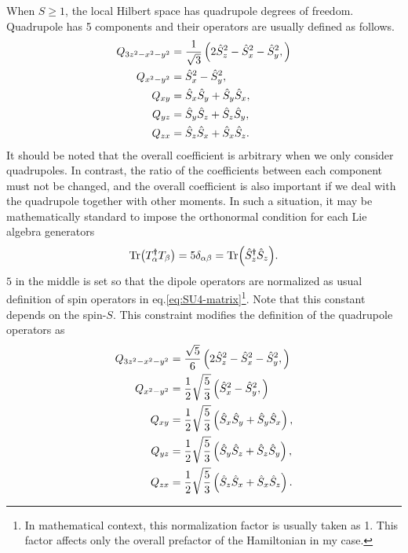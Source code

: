 \documentclass[11pt, aps, longbibliography]{article}
\begin{document}
        When $S\geq 1$, the local Hilbert space has quadrupole degrees of freedom. 
        Quadrupole has 5 components and their operators are usually defined as follows.
        \begin{align}\label{eq:defQ}
            Q_{3z^2-x^2-y^2} &= \frac{1}{\sqrt{3}}\left( 2\hat{S}_z^2 - \hat{S}_x^2 - \hat{S}_y^2, \right) \notag \\
            Q_{x^2-y^2} &= \hat{S}_x^2 - \hat{S}_y^2, \notag \\
            Q_{xy} &= \hat{S}_x\hat{S}_y + \hat{S}_y\hat{S}_x, \\
            Q_{yz} &= \hat{S}_y\hat{S}_z + \hat{S}_z\hat{S}_y, \notag \\
            Q_{zx} &= \hat{S}_z\hat{S}_x + \hat{S}_x\hat{S}_z. \notag 
        \end{align}
        It should be noted that the overall coefficient is arbitrary when we only consider quadrupoles. In contrast, the ratio of the coefficients between each component must not be changed,
        and the overall coefficient is also important if we deal with the quadrupole together with other moments.
        In such a situation, it may be mathematically standard to impose the orthonormal condition for each Lie algebra generators
        \begin{equation}
            \Tr (T_\alpha^\dagger T_\beta) = 5\delta_{\alpha \beta} = \Tr (\hat{S}_{z}^\dagger \hat{S}_{z}).
        \end{equation}
        $5$ in the middle is set so that the dipole operators are normalized as usual definition of spin operators in eq.\eqref{eq:SU4-matrix}\footnote{In mathematical context, this normalization factor is usually taken as 1. This factor affects only the overall prefactor of the Hamiltonian in my case.}.
        Note that this constant depends on the spin-$S$.
        This constraint modifies the definition of the quadrupole operators as
        \begin{align}\label{eq:defQ2}
            Q_{3z^2-x^2-y^2} &= \frac{\sqrt{5}}{6}\left( 2\hat{S}_z^2 - \hat{S}_x^2 - \hat{S}_y^2, \right) \notag \\
            Q_{x^2-y^2} &= \frac{1}{2}\sqrt{\frac{5}{3}} \left( \hat{S}_x^2 - \hat{S}_y^2, \right) \notag \\
            Q_{xy} &= \frac{1}{2}\sqrt{\frac{5}{3}} \left( \hat{S}_x\hat{S}_y + \hat{S}_y\hat{S}_x\right), \\
            Q_{yz} &= \frac{1}{2}\sqrt{\frac{5}{3}} \left( \hat{S}_y\hat{S}_z + \hat{S}_z\hat{S}_y\right), \notag \\
            Q_{zx} &= \frac{1}{2}\sqrt{\frac{5}{3}} \left( \hat{S}_z\hat{S}_x + \hat{S}_x\hat{S}_z\right). \notag 
        \end{align}
\end{document}
